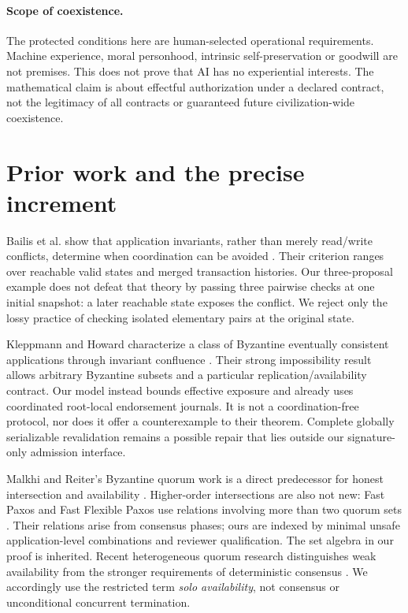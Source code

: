 \documentclass[11pt,a4paper]{article}
\theoremstyle{definition}\newtheorem{definition}{Definition}
\begin{document}
\paragraph{Scope of coexistence.}
The protected conditions here are human-selected operational requirements. Machine experience, moral personhood, intrinsic self-preservation or goodwill are not premises. This does not prove that AI has no experiential interests. The mathematical claim is about effectful authorization under a declared contract, not the legitimacy of all contracts or guaranteed future civilization-wide coexistence.

\section{Prior work and the precise increment}
\label{sec:prior}
Bailis et al. show that application invariants, rather than merely read/write conflicts, determine when coordination can be avoided \cite{bailis}. Their criterion ranges over reachable valid states and merged transaction histories. Our three-proposal example does not defeat that theory by passing three pairwise checks at one initial snapshot: a later reachable state exposes the conflict. We reject only the lossy practice of checking isolated elementary pairs at the original state.

Kleppmann and Howard characterize a class of Byzantine eventually consistent applications through invariant confluence \cite{bec}. Their strong impossibility result allows arbitrary Byzantine subsets and a particular replication/availability contract. Our model instead bounds effective exposure and already uses coordinated root-local endorsement journals. It is not a coordination-free protocol, nor does it offer a counterexample to their theorem. Complete globally serializable revalidation remains a possible repair that lies outside our signature-only admission interface.

Malkhi and Reiter's Byzantine quorum work is a direct predecessor for honest intersection and availability \cite{malkhi}. Higher-order intersections are also not new: Fast Paxos and Fast Flexible Paxos use relations involving more than two quorum sets \cite{fast}. Their relations arise from consensus phases; ours are indexed by minimal unsafe application-level combinations and reviewer qualification. The set algebra in our proof is inherited. Recent heterogeneous quorum research distinguishes weak availability from the stronger requirements of deterministic consensus \cite{satrapy}. We accordingly use the restricted term \emph{solo availability}, not consensus or unconditional concurrent termination.
\end{document}
